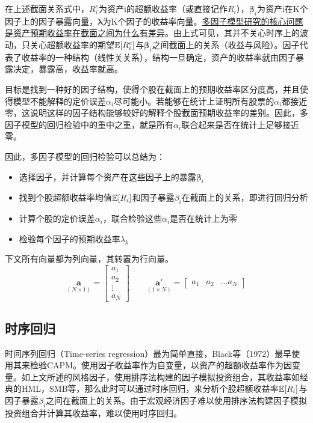 \documentclass[11pt]{article}
\begin{document}
在上述截面关系式中，$R_{i}^{e}$为资产i的超额收益率（或直接记作$R_{i}$），$\bm{\beta}_i$为资产i在K个因子上的因子暴露向量，$\bm{\lambda}$为K个因子的收益率向量。\uline{多因子模型研究的核心问题是资产预期收益率在截面之间为什么有差异}。由上式可见，其并不关心时序上的波动，只关心超额收益率的期望$\mathbb{E}[R_{i}^{e}]$与$\bm{\beta}_i$之间截面上的关系（收益与风险）。因子代表了收益率的一种结构（线性关关系），结构一旦确定，资产的收益率就由因子暴露决定，暴露高，收益率就高。

目标是找到一种好的因子结构，使得个股在截面上的预期收益率区分度高，并且使得模型不能解释的定价误差$\alpha_i$尽可能小。若能够在统计上证明所有股票的$\alpha_i$都接近零，这说明这样的因子结构能够较好的解释个股截面预期收益率的差别。因此，多因子模型的回归检验中的重中之重，就是所有$\alpha_i$联合起来是否在统计上足够接近零。

因此，多因子模型的回归检验可以总结为：
\begin{itemize}
    \item 选择因子，并计算每个资产在这些因子上的暴露$\bm{\beta}_i$
    \item 找到个股超额收益率均值$\mathbb{E}[R_{i}]$和因子暴露$\beta_i$在截面上的关系，即进行回归分析
    \item 计算个股的定价误差$\alpha_i$，联合检验这些$\alpha_i$是否在统计上为零
    \item 检验每个因子的预期收益率$\lambda_k$
\end{itemize}

下文所有向量都为列向量，其转置为行向量。
\begin{equation*}
    \underset{\scriptscriptstyle{(N \times 1)}}{\bm{a}}
    = \begin{bmatrix} a_1 \\ a_2 \\ \vdots \\ a_N \end{bmatrix}
    \qquad
    \underset{\scriptscriptstyle{(1 \times N)}}{\bm{a}'}
    = \begin{bmatrix} a_1 & a_2 & \dots a_N \end{bmatrix}
\end{equation*}

\subsection{时序回归}

时间序列回归（Time-series regression）最为简单直接，Black等（1972）最早使用其来检验CAPM。使用因子收益率作为自变量，以资产的超额收益率作为因变量。如上文所述的风格因子，使用排序法构建的因子模拟投资组合，其收益率如经典的HML，SMB等，那么此时可以通过时序回归，来分析个股超额收益率$\mathbb{E}[R_i]$与因子暴露$\beta_i$之间在截面上的关系。由于宏观经济因子难以使用排序法构建因子模拟投资组合并计算其收益率，难以使用时序回归。
\end{document}
